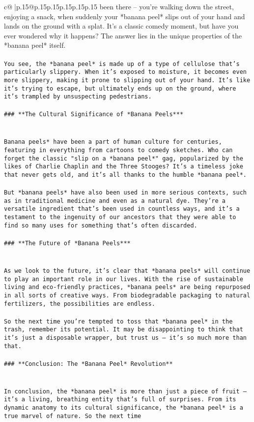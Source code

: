 \documentclass{article}
\begin{document}
{\begin{supertabular}{c@{$\;$}|p{.15\linewidth}@{}p{.15\linewidth}p{.15\linewidth}p{.15\linewidth}p{.15\linewidth}p{.15\linewidth}}
{{{been there – you're walking down the street, enjoying a snack, when suddenly your *banana peel* slips out of your hand and lands on the ground with a splat. It's a classic comedy moment, but have you ever wondered why it happens? The answer lies in the unique properties of the *banana peel* itself.\\ \tt \\ \tt You see, the *banana peel* is made up of a type of cellulose that's particularly slippery. When it's exposed to moisture, it becomes even more slippery, making it prone to slipping out of your hand. It's like it's trying to escape, but ultimately ends up on the ground, where it's trampled by unsuspecting pedestrians.\\ \tt \\ \tt ### **The Cultural Significance of *Banana Peels***\\ \tt \\ \tt \\ \tt *Banana peels* have been a part of human culture for centuries, featuring in everything from cartoons to comedy sketches. Who can forget the classic "slip on a *banana peel*" gag, popularized by the likes of Charlie Chaplin and the Three Stooges? It's a timeless joke that never gets old, and it's all thanks to the humble *banana peel*.\\ \tt \\ \tt But *banana peels* have also been used in more serious contexts, such as in traditional medicine and even as a natural dye. They're a versatile ingredient that's been used in countless ways, and it's a testament to the ingenuity of our ancestors that they were able to find so many uses for something that's often discarded.\\ \tt \\ \tt ### **The Future of *Banana Peels***\\ \tt \\ \tt \\ \tt As we look to the future, it's clear that *banana peels* will continue to play an important role in our lives. With the rise of sustainable living and eco-friendly practices, *banana peels* are being repurposed in all sorts of creative ways. From biodegradable packaging to natural fertilizers, the possibilities are endless.\\ \tt \\ \tt So the next time you're tempted to toss that *banana peel* in the trash, remember its potential. It may be disappointing to think that it's just a disposable wrapper, but trust us – it's so much more than that.\\ \tt \\ \tt ### **Conclusion: The *Banana Peel* Revolution**\\ \tt \\ \tt \\ \tt In conclusion, the *banana peel* is more than just a piece of fruit – it's a living, breathing entity that's full of surprises. From its dynamic anatomy to its cultural significance, the *banana peel* is a true marvel of nature. So the next time }}}
\end{supertabular}}
\end{document}
